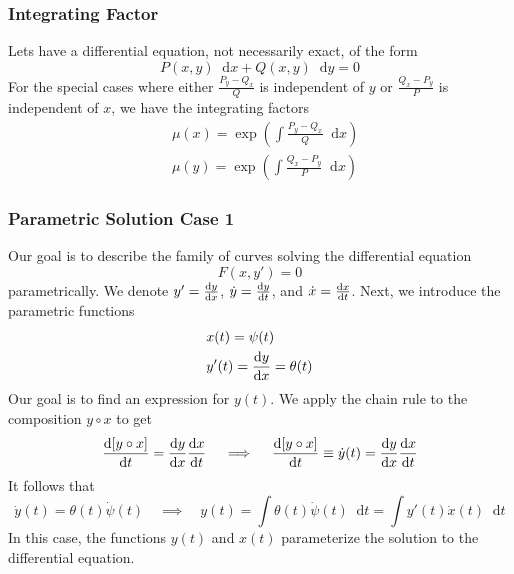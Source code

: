 \documentclass[11pt, a4paper]{article}
\newcommand{\diff}{\mathop{}\!\mathrm{d}} %
\begin{document}
\subsubsection{Integrating Factor}
Lets have a differential equation, not necessarily exact, of the form
\begin{equation*}
	P(x, y) \diff x + Q(x, y) \diff y = 0
\end{equation*}
For the special cases where either $ \frac{P_y - Q_x}{Q} $ is independent of $ y $ or $ \frac{Q_x - P_y}{P} $ is independent of $ x $, we have the integrating factors
\begin{align*}
	& \mu(x) = \exp(\int \frac{P_y - Q_x}{Q} \diff x)\\
	& \mu(y) = \exp(\int \frac{Q_x - P_y}{P} \diff x)
\end{align*}


\subsubsection{Parametric Solution Case 1}
Our goal is to describe the family of curves solving the differential equation
\begin{equation*}
	F(x, y') = 0
\end{equation*}	
parametrically.  We denote $ y' = \dv{y}{x} $, $ \dot{y} = \dv{y}{t} $, and $ \dot{x} = \dv{x}{t} $. Next, we introduce the parametric functions
\begin{align*}
	& x(t) = \psi(t)\\
	& y'(t) = \dv{y}{x} (t) = \theta (t)
\end{align*}
Our goal is to find an expression for $ y(t) $. We apply the chain rule to the composition $ y \circ x $ to get
\begin{align*}
	\dv{[y \circ x]}{t} = \dv{y}{x} \dv{x}{t} \quad \implies \quad \dv{[y \circ x]}{t} \equiv \dot{y}(t) = \dv{y}{x} \dv{x}{t}
\end{align*}
It follows that
\begin{equation*}
	\dot{y}(t) = \theta(t) \dot{\psi}(t) \quad \implies \quad y(t) = \int \theta(t) \dot{\psi}(t)  \diff t = \int y'(t) \dot{x}(t)  \diff t
\end{equation*}
In this case, the functions $ y(t) $ and $ x(t) $ parameterize the solution to the differential equation.
\end{document}
